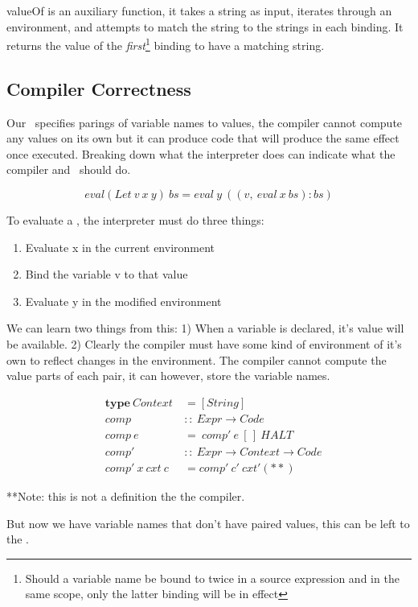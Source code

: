 \documentclass {article}
\begin{document}
valueOf is an auxiliary function,
it takes a string as input, iterates through an
environment, and attempts to match
the string to the strings in each binding.
It returns the value of the \emph{first}\footnote{
Should a variable name be bound to twice in a 
source expression and in the same scope,
only the latter binding will
be in effect} binding
to have a matching string.

\subsection{Compiler Correctness}

Our \env\ specifies parings of 
variable names to values,
the compiler cannot compute any 
values on its own
but it can produce code that will
produce the same effect once executed.
Breaking down what the interpreter
does can indicate what the 
compiler and \vm\ should do.

	\[eval(Let\ v\ x\ y)\ bs 
		= eval\ y\ ((v,\ eval\ x\ bs):bs) \]
	
To evaluate a , the interpreter
must do three things:
\begin{enumerate}
	\item Evaluate x in the current environment
	\item Bind the variable v to that value
	\item Evaluate y in the modified environment
\end{enumerate}

We can learn two things from this:
1) When a variable is declared, it's
value will be available.
2) Clearly the compiler must have some kind of
environment of it's own to
reflect changes in the environment.
The compiler cannot compute the value
parts of each pair,
it can however, 
store the variable names.

\begin{eqnarray*}
	&\textbf{type}\  Context\ &= [String] \\
	&comp &::\ Expr \rightarrow Code \\
	&comp\ e &=\ comp'\ e\ [\,]\ HALT \\
	&comp' &::\ Expr \rightarrow Context \rightarrow Code \\
	&comp'\ x\ cxt\ c &= comp'\ c'\ cxt' (**)
\end{eqnarray*}

**Note: this is not a definition the the compiler.

But now we have variable names
that don't have paired values,
this can be left to the \vm.
\end{document}
